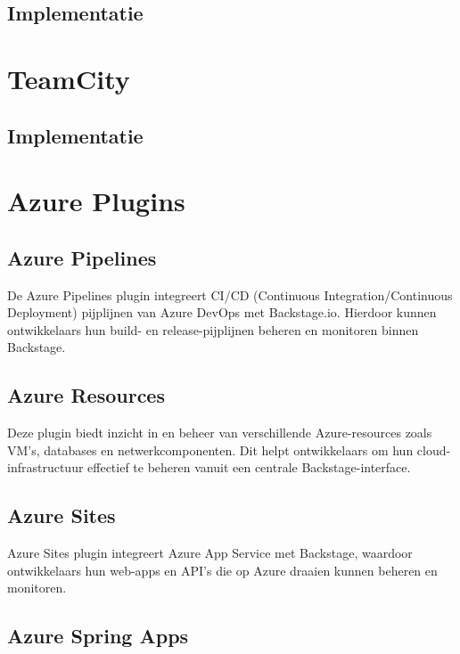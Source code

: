 \subsection{Implementatie}

\section{TeamCity}

\subsection{Implementatie}

\section{Azure Plugins}


\subsection{Azure Pipelines}

De Azure Pipelines plugin integreert CI/CD (Continuous Integration/Continuous Deployment) pijplijnen van Azure DevOps met Backstage.io. Hierdoor kunnen ontwikkelaars hun build- en release-pijplijnen beheren en monitoren binnen Backstage.

\subsection{Azure Resources}

Deze plugin biedt inzicht in en beheer van verschillende Azure-resources zoals VM's, databases en netwerkcomponenten. Dit helpt ontwikkelaars om hun cloud-infrastructuur effectief te beheren vanuit een centrale Backstage-interface.

\subsection{Azure Sites}

Azure Sites plugin integreert Azure App Service met Backstage, waardoor ontwikkelaars hun web-apps en API's die op Azure draaien kunnen beheren en monitoren.

\subsection{Azure Spring Apps}

